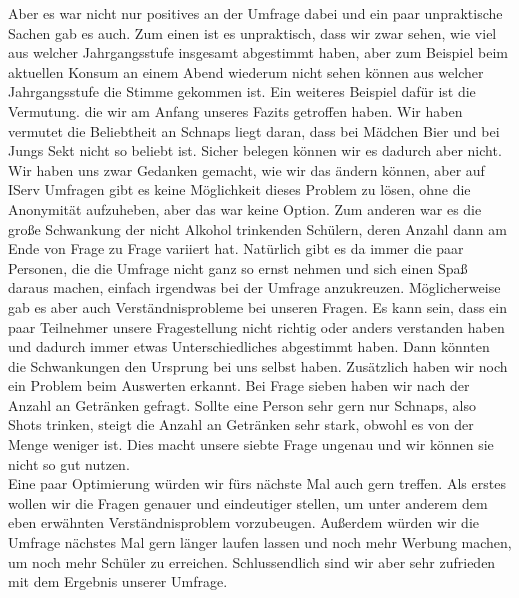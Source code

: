 \documentclass[12pt]{article}
\begin{document}
Aber es war nicht nur positives an der Umfrage dabei und ein paar unpraktische Sachen gab es auch. Zum einen ist es unpraktisch, dass wir zwar sehen, wie viel aus welcher Jahrgangsstufe insgesamt abgestimmt haben, aber zum Beispiel beim aktuellen Konsum an einem Abend wiederum nicht sehen können aus welcher Jahrgangsstufe die Stimme gekommen ist. Ein weiteres Beispiel dafür ist die Vermutung. die wir am Anfang unseres Fazits getroffen haben. Wir haben vermutet die Beliebtheit an Schnaps liegt daran, dass bei Mädchen Bier und bei Jungs Sekt nicht so beliebt ist. Sicher belegen können wir es dadurch aber nicht. Wir haben uns zwar Gedanken gemacht, wie wir das ändern können, aber auf IServ Umfragen gibt es keine Möglichkeit dieses Problem zu lösen, ohne die Anonymität aufzuheben, aber das war keine Option. Zum anderen war es die große Schwankung der nicht Alkohol trinkenden Schülern, deren Anzahl dann am Ende von Frage zu Frage variiert hat. Natürlich gibt es da immer die paar Personen, die die Umfrage nicht ganz so ernst nehmen und sich einen Spaß daraus machen, einfach irgendwas bei der Umfrage anzukreuzen. Möglicherweise gab es aber auch Verständnisprobleme bei unseren Fragen. Es kann sein, dass ein paar Teilnehmer unsere Fragestellung nicht richtig oder anders verstanden haben und dadurch immer etwas Unterschiedliches abgestimmt haben. Dann könnten die Schwankungen den Ursprung bei uns selbst haben. Zusätzlich haben wir noch ein Problem beim Auswerten erkannt. Bei Frage sieben haben wir nach der Anzahl an Getränken gefragt. Sollte eine Person sehr gern nur Schnaps, also Shots trinken, steigt die Anzahl an Getränken sehr stark, obwohl es von der Menge weniger ist. Dies macht unsere siebte Frage ungenau und wir können sie nicht so gut nutzen.\\
Eine paar Optimierung würden wir fürs nächste Mal auch gern treffen. Als erstes wollen wir die Fragen genauer und eindeutiger stellen, um unter anderem dem eben erwähnten Verständnisproblem vorzubeugen. Außerdem würden wir die Umfrage nächstes Mal gern länger laufen lassen und noch mehr Werbung machen, um noch mehr Schüler zu erreichen. 
Schlussendlich sind wir aber sehr zufrieden mit dem Ergebnis unserer Umfrage. 
\end{document}
